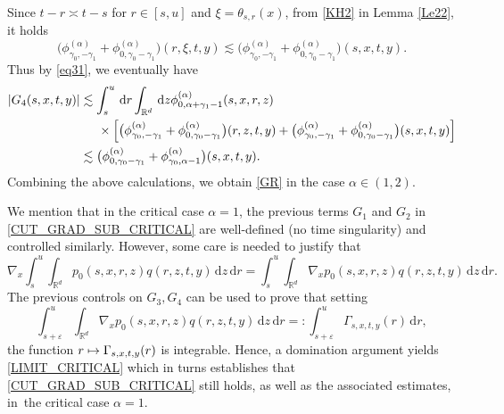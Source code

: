 \documentclass[JEP,XML,SOM,Unicode,published]{cedram}
\def\mto{\mathchoice{\longmapsto}{\mapsto}{\mapsto}{\mapsto}}
\theoremstyle{plain}
\theoremstyle{definition}
\let\eps\varepsilon
\newcommand\mR{\mathbb{R}}
\newcommand\1{{\mathbf{1}}}
\newcommand{\dif}{\,\mathrm{d}}
\begin{document}
Since $t-r \asymp t-s$ for $r\in[s,u]$ and $\xi=\theta_{s,r}(x)$, from \eqref{KH2} in Lemma \ref{Le22}, it holds
\[
\bigl(\phi^{(\alpha)}_{\gamma_0,-\gamma_1}+\phi^{(\alpha)}_{0,\gamma_0-\gamma_1}\bigr)(r,\xi,t,y)\lesssim \bigl(\phi^{(\alpha)}_{\gamma_0,-\gamma_1}+\phi^{(\alpha)}_{0,\gamma_0-\gamma_1}\bigr)(s,x,t,y).
\]
Thus by \eqref{eq31}, we eventually have
\begin{align*}
|G_4(s,x,t,y)|
&\lesssim \int_s^u\dif r \int_{\mR^d} \dif z \phi_{0,\alpha+\gamma_1-1}^{(\alpha)}(s,x,r,z)\\
&\hspace*{.5cm}\times\Big[ \bigl(\phi^{(\alpha)}_{\gamma_0,-\gamma_1}+\phi^{(\alpha)}_{0,\gamma_0-\gamma_1}\bigr)(r,z,t,y)+ \bigl(\phi^{(\alpha)}_{\gamma_0,-\gamma_1}+\phi^{(\alpha)}_{0,\gamma_0-\gamma_1}\bigr)(s,x,t,y) \Big]\\
&\lesssim \bigl(\phi^{(\alpha)}_{0,\gamma_0-\gamma_1}+\phi^{(\alpha)}_{\gamma_0,\alpha-1}\bigr)(s,x,t,y).
\end{align*}
Combining the above calculations, we obtain \eqref{GR} in the case $\alpha\in (1,2) $.

{We mention that in the critical case $\alpha=1 $, the previous terms $G_1$ and $G_2$ in \eqref{CUT_GRAD_SUB_CRITICAL} are well-defined (no time singularity) and controlled similarly. However, some care is needed to justify that
\begin{equation}\label{LIMIT_CRITICAL}
\nabla_x \int_s^u\!\!\int_{\mR^d}\!\! {p}_0(s,x,r,z)q(r,z,t,y)\dif z \dif r =\int_s^u\!\!\int_{\mR^d}\!\!\nabla_x {p}_0(s,x,r,z)q(r,z,t,y)\dif z \dif r.
\end{equation}
The previous controls on $G_3,G_4$ can be used to prove that setting
\[
\int_{s+\varepsilon}^u\int_{\mR^d}\nabla_x {p}_0(s,x,r,z)q(r,z,t,y)\dif z \dif r=:\int_{s+\eps}^u
\Gamma_{s,x,t,y}(r)\dif r,
\] the function $r\mto \Gamma_{s,x,t,y}(r) $ is integrable.
Hence, a domination argument yields \eqref{LIMIT_CRITICAL} which in turns establishes that \eqref{CUT_GRAD_SUB_CRITICAL} still holds, as well as the associated estimates, in~the critical case $\alpha=1 $}.
\end{document}
